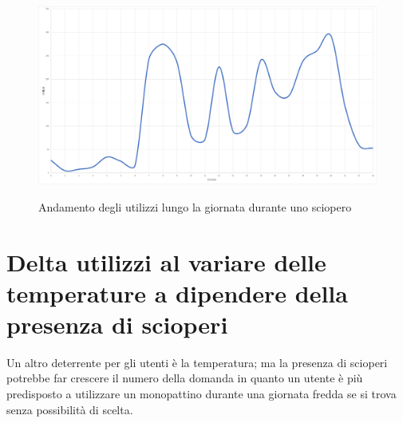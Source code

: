 \begin{figure}[H]                                                                                                                                                            
\centering                                                                                                                                                                   
\includegraphics[width=\textwidth]{images/result3}                                                                                                                                   
\label{fig:result3}
\caption{Andamento degli utilizzi lungo la giornata durante uno sciopero}                                                                                                                                                                                                                                                                                                                     
\end{figure}


\section{Delta utilizzi al variare delle temperature a dipendere della presenza di scioperi}
Un altro deterrente per gli utenti è la temperatura; ma la presenza di scioperi potrebbe
far crescere il numero della domanda in quanto un utente è più predisposto a utilizzare un 
monopattino durante una giornata fredda se si trova senza possibilità di scelta.

